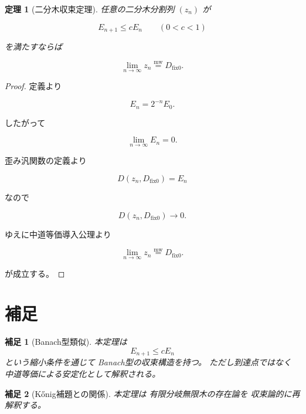 \documentclass[12pt,a4paper]{article}
\newcommand{\mweq}{\mathrel{\overset{\mathrm{mw}}{=}}}
\newcommand{\dfix}{D_{\mathrm{fix}0}}
\newtheorem{theorem}{定理}
\newtheorem{scholium}{補足}
\begin{document}
\begin{theorem}[二分木収束定理]
任意の二分木分割列 $(z_n)$ が

\[
E_{n+1}\le cE_n
\qquad (0<c<1)
\]

を満たすならば

\[
\lim_{n\to\infty}
z_n
\mweq
\dfix.
\]

\end{theorem}

\begin{proof}

定義より

\[
E_n=2^{-n}E_0.
\]

したがって

\[
\lim_{n\to\infty}E_n=0.
\]

歪み汎関数の定義より

\[
D(z_n,\dfix)=E_n
\]

なので

\[
D(z_n,\dfix)\to 0.
\]

ゆえに中道等価導入公理より

\[
\lim_{n\to\infty}
z_n
\mweq
\dfix.
\]

が成立する。

\end{proof}

\section{補足}

\begin{scholium}[Banach型類似]
本定理は
\[
E_{n+1}\le cE_n
\]
という縮小条件を通じて
\textit{Banach型}の収束構造を持つ。
ただし到達点ではなく
中道等価による安定化として解釈される。
\end{scholium}

\begin{scholium}[K\H{o}nig補題との関係]
本定理は
有限分岐無限木の存在論を
収束論的に再解釈する。
\end{scholium}
\end{document}
